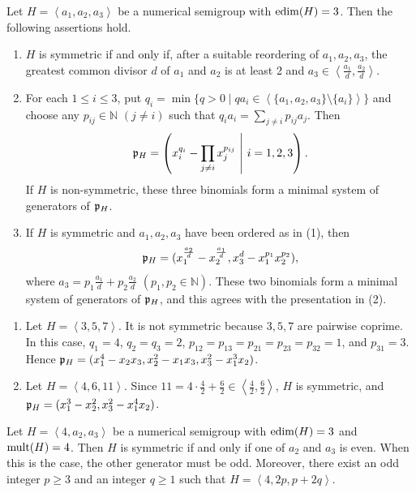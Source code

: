\begin{theorem}\label{thm:herzog}
	Let $H=\left<a_1, a_2, a_3\right>$ be a numerical semigroup with $\operatorname{edim}(H) = 3$. Then the following assertions hold.
	\begin{enumerate}
		\item $H$ is symmetric if and only if, after a suitable reordering of $a_1, a_2, a_3$, the greatest common divisor $d$ of $a_1$ and $a_2$ is at least 2 and $a_3 \in \left<\frac{a_1}{d}, \frac{a_2}{d}\right>$.
		\item For each $1\le i\le3$, put $q_i = \min\{q >0\mid qa_i \in \left<\{a_1, a_2,a_3\} \setminus \{a_i\}\right>\}$ and choose any $p_{ij}\in\mathbb N$ $(j\ne i)$ such that $q_i a_i = \sum_{j\ne i}p_{ij}a_j$. Then $$\mathfrak{p}_H = \left(x_i^{q_i} - \prod_{j\ne i}x_j^{p_{ij}} ~\middle|~ i = 1,2,3\right).$$
		If $H$ is non-symmetric, these three binomials form a minimal system of
		generators of $\mathfrak{p}_H$.
		\item If $H$ is symmetric and $a_1,a_2,a_3$ have been ordered as in (1), then $$\mathfrak{p}_H = (x_1^{\frac{a_2}{d}} - x_2^{\frac{a_1}{d}}, x_3^d - x_1^{p_1}x_2^{p_2}),$$ where $a_3 = p_1 \frac{a_1}{d} + p_2 \frac{a_2}{d}$ $(p_1, p_2 \in \mathbb{N})$. These two binomials form a minimal system of generators of $\mathfrak{p}_H$, and this agrees with the presentation in (2).
	\end{enumerate}
\end{theorem}

\begin{example}
	\begin{enumerate}
		\item Let $H=\left<3,5,7\right>$. It is not symmetric because $3,5,7$ are pairwise coprime. In this case, $q_1 = 4$, $q_2 = q_3 = 2$, $p_{12} = p_{13} = p_{21} = p_{23} = p_{32} = 1$, and $p_{31} = 3$. Hence $\mathfrak{p}_H= (x_1^4 - x_2x_3, x_2^2-x_1x_3,x_3^2-x_1^3x_2)$.
		\item Let $H=\left<4,6,11\right>$. Since $11 = 4 \cdot \frac{4}{2} + \frac{6}{2} \in \left<\frac{4}{2}, \frac{6}{2}\right>$, $H$ is symmetric, and $\mathfrak{p}_H = (x_1^3-x_2^2, x_3^2-x_1^4x_2)$.
	\end{enumerate}
\end{example}

\begin{corollary}\label{cor:emb4symm}
	Let $H=\left<4,a_2, a_3\right>$ be a numerical semigroup with $\operatorname{edim}(H) = 3$ and $\operatorname{mult}(H) = 4$.
	Then $H$ is symmetric if and only if one of $a_2$ and $a_3$ is even. When this is the case, the other generator must be odd.
	Moreover, there exist an odd integer $p\geq3$ and an integer $q\geq1$ such
	that $H=\left<4,2p,p+2q\right>$.
\end{corollary}


